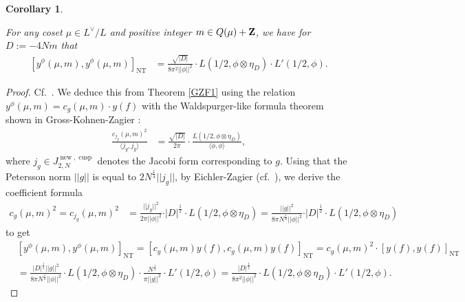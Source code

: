 \documentclass{amsart}
\newtheorem{corollary}[theorem]{Corollary}
\theoremstyle{definition}
\theoremstyle{definition}
\theoremstyle{definition}
\begin{document}
\begin{corollary}\label{GZFprincipal} 

For any coset $\mu \in L^{\vee}/L$ and positive integer $m \in Q(\mu) + {\bf{Z}}$, we have for $D:= - 4 N m$ that 
\begin{align*} \left[ y^{\phi}(\mu, m), y^{\phi}(\mu, m) \right]_{\operatorname{NT}} 
&= \frac{\sqrt{\vert D \vert}}{8 \pi^2 \vert \vert \phi \vert \vert^2} \cdot L(1/2, \phi \otimes \eta_D) \cdot L'(1/2, \phi). \end{align*}

 \end{corollary}

\begin{proof} Cf.~\cite[Corollary 7.8]{BY}. We deduce this from Theorem \ref{GZF1} 
using the relation $y^{\phi}(\mu, m) = c_g(\mu, m) \cdot y(f)$ with the Waldspurger-like 
formula theorem shown in Gross-Kohnen-Zagier \cite[II, $\S$4 Corollary 1]{GKZ}:
\begin{align*}\frac{c_{j_g}(\mu, m)^2}{\langle j_g, j_g  \rangle} 
&= \frac{ \sqrt{\vert D \vert} }{2 \pi }  \cdot \frac{L(1/2, \phi \otimes \eta_D)}{\langle \phi, \phi \rangle},\end{align*}
where $j_g \in J_{2, N}^{\operatorname{new}, \operatorname{cusp}}$ denotes the Jacobi form corresponding to $g$.
Using that the Petersson norm $\vert \vert g \vert \vert$ is equal to $2 N^{\frac{1}{4}} \vert \vert j_g \vert \vert$,
by Eichler-Zagier \cite[Theorem 5.3]{EZ} (cf.~\cite[Corollary 7.8]{BY}), we derive the coefficient formula 
\begin{align}\label{GKZ} c_g(\mu, m)^2 = c_{j_g}(\mu, m)^2 &= \frac{\vert \vert j_g \vert \vert^2}{ 2 \pi \vert \vert \phi \vert \vert^2} 
\cdot \vert D \vert^{\frac{1}{2}}\cdot L(1/2, \phi \otimes \eta_D) = \frac{\vert \vert g \vert \vert^2}{8 \pi N^{\frac{1}{2}} \vert \vert \phi \vert \vert^2} 
\cdot \vert D \vert^{\frac{1}{2}} \cdot L(1/2, \phi \otimes \eta_D) \end{align} to get 
\begin{align*} &\left[ y^{\phi}(\mu, m), y^{\phi}(\mu, m) \right]_{\operatorname{NT}} 
= \left[ c_g(\mu, m) y(f), c_g(\mu, m) y(f) \right]_{\operatorname{NT}} = c_g(\mu, m)^2 \cdot \left[  y(f), y(f) \right]_{\operatorname{NT}} \\
&= \frac{ \vert D \vert^{\frac{1}{2}} \vert \vert g \vert \vert^2}{8 \pi N^{\frac{1}{2}} \vert \vert \phi \vert \vert^2}  \cdot L(1/2, \phi \otimes \eta_D) 
\cdot  \frac{ N^{\frac{1}{2}}  }{ \pi \vert \vert g \vert \vert^2} \cdot L'(1/2, \phi) 
= \frac{ \vert D \vert^{\frac{1}{2}}  }{8 \pi^2 \vert \vert \phi \vert \vert^2} \cdot L(1/2, \phi \otimes \eta_D) \cdot L'(1/2, \phi). \end{align*} \end{proof}
\end{document}
